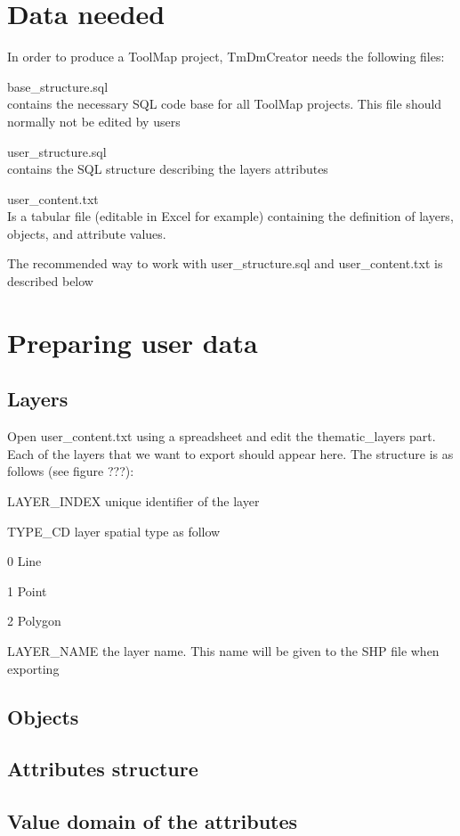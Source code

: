 \documentclass[a4paper, 12pt]{article}
\begin{document}
\section{Data needed}
In order to produce a ToolMap project, TmDmCreator needs the following files:
    \begin{description*}
  \item[base\_structure.sql]\hfill \\ contains the necessary SQL code base for all ToolMap projects. This file should normally not be edited by users
  \item[user\_structure.sql]\hfill \\ contains the SQL structure describing the layers attributes
  \item[user\_content.txt]\hfill \\ Is a tabular file (editable in Excel for example) containing the definition of layers, objects, and attribute values.
\end{description*}
The recommended way to work with user\_structure.sql and user\_content.txt is described below


\section{Preparing user data}

\subsection{Layers}
Open user\_content.txt using a spreadsheet and edit the thematic\_layers part. Each of the layers that we want to export should appear here. The structure is as follows (see figure ???):
\begin{description*}
  \item [LAYER\_INDEX] unique identifier of the layer
  \item [TYPE\_CD] layer spatial type as follow
    \begin{description*}
      \item [0] Line
      \item [1] Point
      \item [2] Polygon
    \end{description*}
  \item [LAYER\_NAME] the layer name. This name will be given to the SHP file when exporting
\end{description*}

\subsection{Objects}

\subsection{Attributes structure}

\subsection{Value domain of the attributes}
\end{document}
